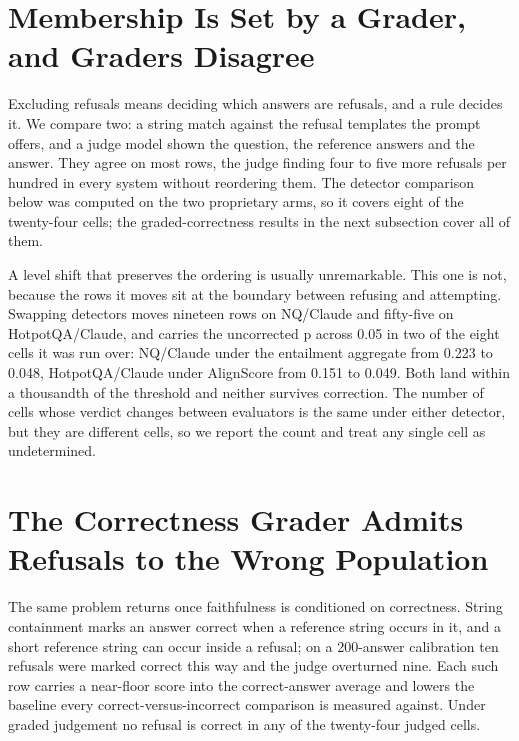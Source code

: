 \documentclass[11pt]{article}
\begin{document}
\section{Membership Is Set by a Grader, and Graders Disagree}
\label{sec:graders}

Excluding refusals means deciding which answers are refusals, and a rule decides it. We compare two: a string match against the refusal templates the prompt offers, and a judge model shown the question, the reference answers and the answer. They agree on most rows, the judge finding four to five more refusals per hundred in every system without reordering them. The detector comparison below was computed on the two proprietary arms, so it covers eight of the twenty-four cells; the graded-correctness results in the next subsection cover all of them.

A level shift that preserves the ordering is usually unremarkable. This one is not, because the rows it moves sit at the boundary between refusing and attempting. Swapping detectors moves nineteen rows on NQ/Claude and fifty-five on HotpotQA/Claude, and carries the uncorrected p across 0.05 in two of the eight cells it was run over: NQ/Claude under the entailment aggregate from 0.223 to 0.048, HotpotQA/Claude under AlignScore from 0.151 to 0.049. Both land within a thousandth of the threshold and neither survives correction. The number of cells whose verdict changes between evaluators is the same under either detector, but they are different cells, so we report the count and treat any single cell as undetermined.

\section{The Correctness Grader Admits Refusals to the Wrong Population}
\label{sec:refusals}

The same problem returns once faithfulness is conditioned on correctness. String containment marks an answer correct when a reference string occurs in it, and a short reference string can occur inside a refusal; on a 200-answer calibration ten refusals were marked correct this way and the judge overturned nine. Each such row carries a near-floor score into the correct-answer average and lowers the baseline every correct-versus-incorrect comparison is measured against. Under graded judgement no refusal is correct in any of the twenty-four judged cells.
\end{document}
